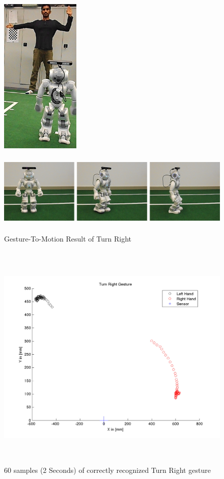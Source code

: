 \begin{figure}
	[h] 
	\begin{minipage}
		{1 
		\textwidth} \centering 
		\includegraphics[height=75mm]{figures/result/usr-turn-right.jpg} \caption*{} 
	\end{minipage}
	\begin{minipage}
		{1 
		\textwidth} 
		\includegraphics[height=42mm]{figures/result/nao-gm-turn-right.jpg} 
	\end{minipage}
	\caption{Gesture-To-Motion Result of Turn Right} \label{res:gm:turn:right} 
\end{figure}
\begin{figure}
	[h] \centering 
	\includegraphics[height=110mm]{figures/result/test-turn-right.jpg} \caption{60 samples (2 Seconds) of correctly recognized Turn Right gesture}
	\label{res:pl:turn:right} 
\end{figure}
